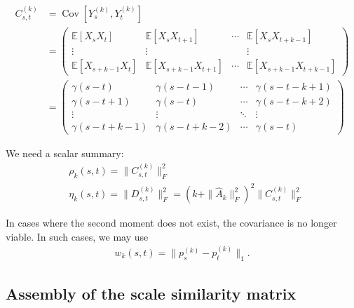 \begin{align*}
    C_{s,t}^{(k)}&=\operatorname{Cov}\left[Y_s^{(k)},Y_t^{(k)}\right]\\&=
    \begin{pmatrix}
        \mathbb{E}[X_sX_t] & \mathbb{E}[X_sX_{t+1}] & \cdots & \mathbb{E}[X_sX_{t+k-1}]\\
        \vdots & \vdots & & \vdots\\
        \mathbb{E}[X_{s+k-1}X_t] & \mathbb{E}[X_{s+k-1}X_{t+1}] & \cdots & \mathbb{E}[X_{s+k-1}X_{t+k-1}]
    \end{pmatrix}\\&
    =\begin{pmatrix}
        \gamma(s-t) & \gamma(s-t-1) & \cdots & \gamma(s-t-k+1)\\
        \gamma(s-t+1) & \gamma(s-t) & \cdots & \gamma(s-t-k+2)\\
        \vdots & \vdots & \ddots & \vdots\\
        \gamma(s-t+k-1) & \gamma(s-t+k-2) & \cdots & \gamma(s-t)
    \end{pmatrix}
\end{align*}

We need a scalar summary:
\begin{align*}
    &\rho_k(s,t)=\|C_{s,t}^{(k)}\|_F^2\\
    &\eta_k(s,t)=\|D_{s,t}^{(k)}\|_F^2=\left(k+\|\hat{A}_k\|_F^2\right)^2\|C_{s,t}^{(k)}\|_F^2
\end{align*}


In cases where the second moment does not exist, the covariance is no longer viable. In such cases, we may use
\begin{align*}
    w_k(s,t)=\|p_s^{(k)}-p_t^{(k)}\|_1.
\end{align*}



\subsection*{Assembly of the scale similarity matrix}

